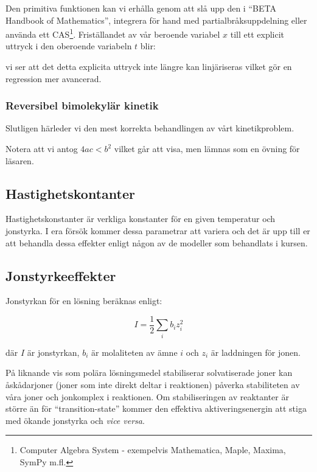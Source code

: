 

Den primitiva funktionen kan vi erhålla genom att slå upp den i ``BETA Handbook of
Mathematics'', integrera för hand med partialbråksuppdelning eller
använda ett CAS\footnote{  Computer Algebra System -   exempelvis
  Mathematica, Maple, Maxima, SymPy m.fl.}. Friställandet av vår beroende
variabel $x$ till ett explicit uttryck i den oberoende variabeln $t$
blir:



vi ser att det detta explicita uttryck inte längre kan linjäriseras
vilket gör en regression mer avancerad.

\subsubsection{Reversibel bimolekylär kinetik}
Slutligen härleder vi den mest korrekta behandlingen av vårt kinetikproblem.
\label{sec:rev_binary}




Notera att vi antog $4ac < b^2$ vilket går att visa, men lämnas som en
övning för läsaren.


\subsection{Hastighetskontanter}
Hastighetskonstanter är verkliga konstanter för en given temperatur och
jonstyrka. I era försök kommer dessa parametrar att variera och det är
upp till er att behandla dessa effekter enligt någon av de modeller som
behandlats i kursen.

\subsection{Jonstyrkeeffekter}
Jonstyrkan för en lösning beräknas enligt:

\begin{equation}
  \label{eq:ionic-strength}
  I = \frac{1}{2}\sum_i b_iz_i^2
\end{equation}

där $I$ är jonstyrkan, $b_i$ är molaliteten av ämne $i$ och $z_i$ är
laddningen för jonen.

På liknande vis som polära lösningsmedel stabiliserar
solvatiserade joner kan åskådarjoner (joner som inte
direkt deltar i reaktionen) påverka stabiliteten av våra joner och
jonkomplex i reaktionen. Om stabiliseringen av reaktanter är större än
för ``transition-state'' kommer den effektiva aktiveringsenergin att
stiga med ökande jonstyrka och \emph{vice versa}.

